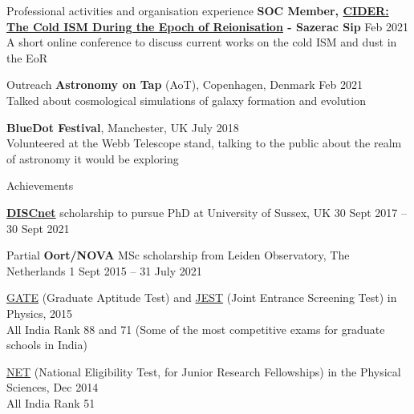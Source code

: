 \documentclass[a4paper,10pt]{resume} %
\begin{document}
\begin{rSection}{Professional activities and organisation experience}
	{\textbf{SOC Member, \href{http://sazerac-conference.org/SIPS2021/4.html}{CIDER: The Cold ISM During the Epoch of Reionisation} - Sazerac Sip}} \hfill {Feb 2021}
	\\
	{A short online conference to discuss current works on the cold ISM and dust in the EoR}
	
\end{rSection}



\begin{rSection}{Outreach}
	{\textbf{Astronomy on Tap} (AoT), Copenhagen, Denmark} \hfill {Feb 2021}
	\\
	{Talked about cosmological simulations of galaxy formation and evolution}
	
	{\textbf{BlueDot Festival}, Manchester, UK} \hfill {July 2018}
	\\
	{Volunteered at the Webb Telescope stand, talking to the public about the realm of astronomy it would be exploring}
\end{rSection}



\begin{rSection}{Achievements}

{\textbf{\href{https://www.discnet.sussex.ac.uk/}{DISCnet}} scholarship to pursue PhD at University of Sussex, UK} \hfill {30 Sept 2017 -- 30 Sept 2021}

{Partial \textbf{Oort/NOVA} MSc scholarship from Leiden Observatory, The Netherlands} \hfill {1 Sept 2015 -- 31 July 2021}

{\href{https://en.wikipedia.org/wiki/Graduate_Aptitude_Test_in_Engineering}{\color{blue}GATE} (Graduate Aptitude Test) and \href{https://en.wikipedia.org/wiki/Joint_Entrance_Screening_Test}{\color{blue}JEST} (Joint Entrance Screening Test) in Physics,} \hfill {2015}\\
All India Rank 88 and 71 (Some of the most competitive exams for graduate schools in India)

{\href{https://en.wikipedia.org/wiki/National_Eligibility_Test}{\color{blue}NET} (National Eligibility Test, for Junior Research Fellowships) in the Physical Sciences,} \hfill {Dec 2014}\\
All India Rank 51
\end{rSection}
\end{document}

